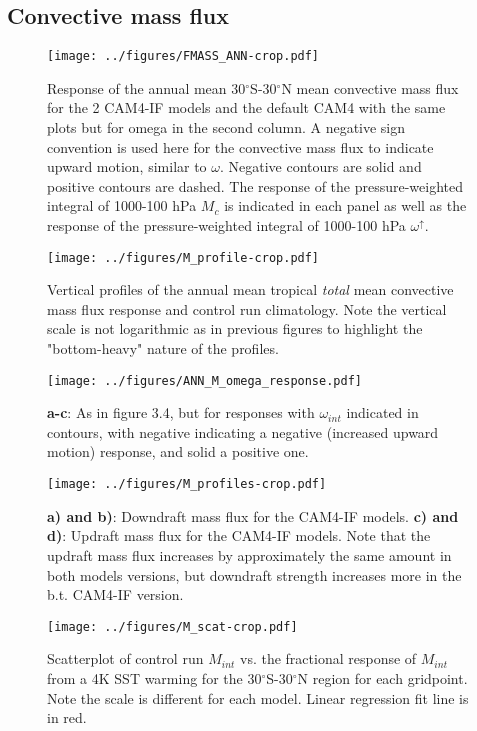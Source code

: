 \documentclass[letterpaper,12pt,titlepage,oneside,final]{book}
\begin{document}
\subsection{Convective mass flux}
\newpage
\begin{figure}[H]
\centering
\noindent\texttt{[image: ../figures/FMASS\_ANN-crop.pdf]}\hfill
\caption{Response of the annual mean 30$^\circ$S-30$^\circ$N mean convective mass flux for the 2 CAM4-IF models and the default CAM4 with the same plots but for omega in the second column. A negative sign convention is used here for the convective mass flux to indicate upward motion, similar to $\omega$. Negative contours are solid and positive contours are dashed. The response of the pressure-weighted integral of 1000-100 hPa $M_{c}$ is indicated in each panel as well as the response of the pressure-weighted integral of 1000-100 hPa $\omega^{\uparrow}$.}
\label{fig:Mc}
\end{figure}


\newpage
\begin{figure}[H]
\centering
\noindent\texttt{[image: ../figures/M\_profile-crop.pdf]}\hfill
\caption{Vertical profiles of the annual mean tropical \textit{total} mean convective mass flux response and control run climatology. Note the vertical scale is not logarithmic as in previous figures to highlight the "bottom-heavy" nature of the profiles.}
\end{figure}

\begin{figure}[H]
\centering
\noindent\texttt{[image: ../figures/ANN\_M\_omega\_response.pdf]}\hfill
\caption{\textbf{a-c}: As in figure 3.4, but for responses with $\omega_{int}$ indicated in contours, with negative indicating a negative (increased upward motion) response, and solid a positive one.}
\end{figure}


\newpage
\begin{figure}[H]
\centering
\noindent\texttt{[image: ../figures/M\_profiles-crop.pdf]}\hfill
\caption{\textbf{a) and b)}: Downdraft mass flux for the CAM4-IF models. \textbf{c) and d)}: Updraft mass flux for the CAM4-IF models. Note that the updraft mass flux increases by approximately the same amount in both models versions, but downdraft strength increases more in the b.t. CAM4-IF version.}
\label{fig:updown}
\end{figure}

\begin{figure}[H]
\centering
\noindent\texttt{[image: ../figures/M\_scat-crop.pdf]}\hfill
\caption{Scatterplot of control run $M_{int}$ vs. the fractional response of $M_{int}$ from a 4K SST warming for the 30$^\circ$S-30$^\circ$N region for each gridpoint. Note the scale is different for each model. Linear regression fit line is in red.}
\end{figure}
\end{document}
